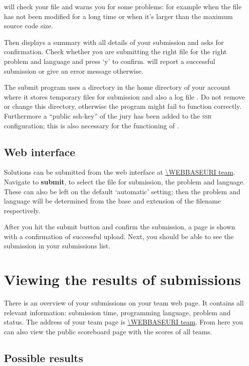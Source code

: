  will check your file and warns you for some problems:
for example when the file has not been modified for a long time or
when it's larger than the maximum source code size.

Then  displays a summary with all details of your
submission and asks for confirmation. Check whether you are submitting
the right file for the right problem and language and press `y' to
confirm.  will report a successful submission or give
an error message otherwise.

The submit program uses a directory \cmd{\USERSUBMITDIR} in the
home directory of your account where it stores temporary files for
submission and also a log file . Do not remove or
change this directory, otherwise the  program might fail to
function correctly. Furthermore a ``public ssh-key'' of the jury has
been added to the \textsc{ssh} configuration; this is also necessary
for the functioning of .

\subsection{Web interface}

Solutions can be submitted from the web interface at \url{\WEBBASEURI team}.
Navigate to \textbf{submit}, to select the file for
submission, the problem and language. These can also be left on the
default `automatic' setting; then the problem and language will be
determined from the base and extension of the filename respectively.

After you hit the submit button and confirm the submission, a page is
shown with a confirmation of successful upload. Next, you should be
able to see the submission in your submissions list.

\section{Viewing the results of submissions}

There is an overview of your submissions on your team web page.
It contains all relevant information: submission time, programming
language, problem and status. The address of your team page is
\url{\WEBBASEURI team}. From here you can also view the public
scoreboard page with the scores of all teams.

\subsection{Possible results}

